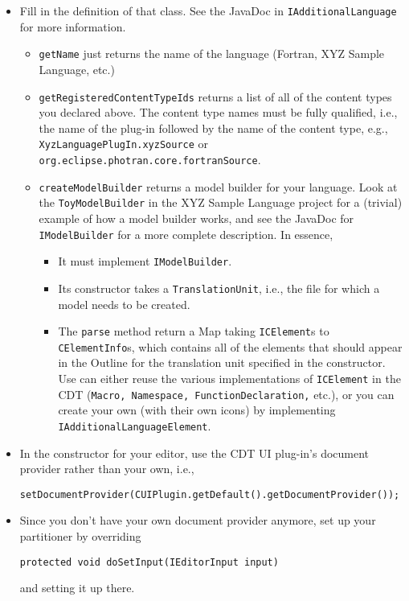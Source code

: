 \begin{itemize}
\item Fill in the definition of that class.  See the JavaDoc in
\texttt{IAdditionalLanguage} for more information.
\begin{itemize}
\item \texttt{getName} just returns the name of the language
(Fortran, XYZ Sample Language, etc.)
\item \texttt{getRegisteredContentTypeIds} returns a list of all of
the content types you declared above.  The content type names must
be fully qualified, i.e., the name of the plug-in followed by the name
of the content type, e.g., \texttt{XyzLanguagePlugIn.xyzSource}
or \texttt{org.eclipse.photran.core.fortranSource}.
\item \texttt{createModelBuilder} returns a model builder for your
language.  Look at the \texttt{ToyModelBuilder} in the XYZ Sample Language
project for a (trivial) example of how a model builder works, and
see the JavaDoc for \texttt{IModelBuilder} for a more complete description.
In essence,
\begin{itemize}
\item It must implement \texttt{IModelBuilder}.
\item Its constructor takes a \texttt{TranslationUnit}, i.e., the file
for which a model needs to be created.
\item The \texttt{parse} method return a Map taking
\texttt{ICElement}s to \texttt{CElementInfo}s, which contains all of the
elements that should appear in the Outline for the translation unit
specified in the constructor.  Use can either reuse the various implementations
of \texttt{ICElement} in the CDT (\texttt{Macro, Namespace,
FunctionDeclaration,} etc.), or you can create your own (with their own
icons) by implementing \texttt{IAdditionalLanguageElement}.
\end{itemize}
\end{itemize}

\item In the constructor for your editor, use the CDT UI plug-in's document
provider rather than your own, i.e.,
\begin{verbatim}
setDocumentProvider(CUIPlugin.getDefault().getDocumentProvider());
\end{verbatim}

\item Since you don't have your own document provider anymore, set up
your partitioner by overriding
\begin{verbatim}
protected void doSetInput(IEditorInput input)
\end{verbatim}
and setting it up there.


\end{itemize}
